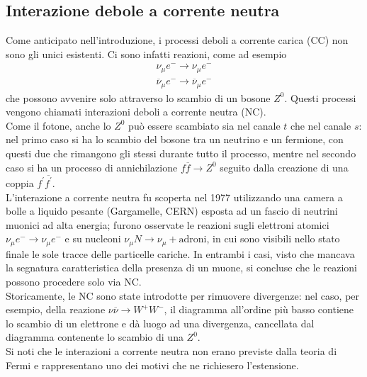 \documentclass{subnucbo}
\begin{document}
\subsection{Interazione debole a corrente neutra}
Come anticipato nell'introduzione, i processi deboli a corrente carica (CC) non sono gli unici esistenti. Ci sono infatti reazioni, come ad esempio
\begin{equation}
        \begin{array} { c } { \nu _ { \mu } e ^ { - } \rightarrow \nu _ { \mu } e ^ { - } } \\ { \overline { \nu } _ { \mu } e ^ { - } \rightarrow \overline { \nu } _ { \mu } e ^ { - } } \end{array}
        \label{eq:neutral_current}
\end{equation}
che possono avvenire solo attraverso lo scambio di un bosone $Z^{0}$. Questi processi vengono chiamati interazioni deboli a corrente neutra (NC). \\
Come il fotone, anche lo $Z^{0}$ può essere scambiato sia nel canale $t$ che nel canale $s$: nel primo caso si ha lo scambio del bosone tra un neutrino e un fermione, con questi due che rimangono gli stessi durante tutto il processo, mentre nel secondo caso si ha un processo di annichilazione $f \overline { f } \rightarrow Z ^ { 0 }$ seguito dalla creazione di una coppia $f ^ { \prime } \overline { f ^ { \prime } }$. \\
L'interazione a corrente neutra fu scoperta nel 1977 utilizzando una camera a bolle a liquido pesante (Gargamelle, CERN) esposta ad un fascio di neutrini muonici ad alta energia; furono osservate le reazioni sugli elettroni atomici $\nu _ { \mu } e ^ { - } \rightarrow \nu _ { \mu } e ^ { - }$ e su nucleoni $\nu _ { \mu } N \rightarrow \nu _ { \mu } + \text {adroni}$, in cui sono visibili nello stato finale le sole tracce delle particelle cariche. In entrambi i casi, visto che mancava la segnatura caratteristica della presenza di un muone, si concluse che le reazioni possono procedere solo via NC. \\
Storicamente, le NC sono state introdotte per rimuovere divergenze: nel caso, per esempio, della reazione $\nu \overline { \nu } \rightarrow W ^ { + } W ^ { - }$, il diagramma all'ordine più basso contiene lo scambio di un elettrone e dà luogo ad una divergenza, cancellata dal diagramma contenente lo scambio di una $Z^{0}$. \\
Si noti che le interazioni a corrente neutra non erano previste dalla teoria di Fermi e rappresentano uno dei motivi che ne richiesero l'estensione.
\end{document}

